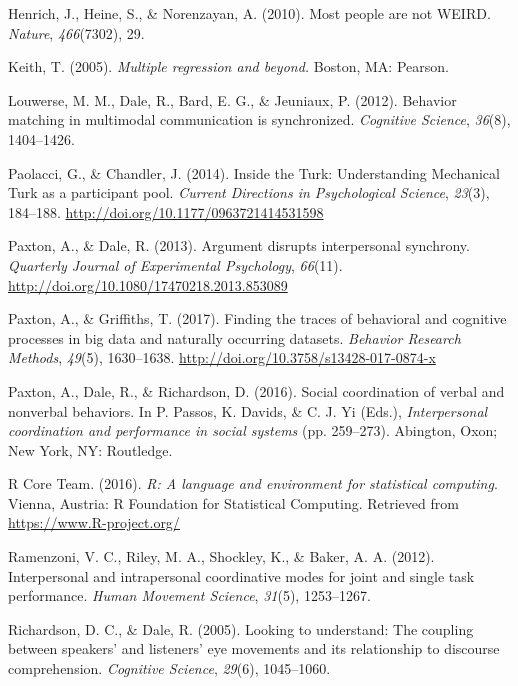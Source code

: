 \documentclass[10pt, letterpaper]{article}
\begin{document}
\hypertarget{ref-henrich2010most}{}
Henrich, J., Heine, S., \& Norenzayan, A. (2010). Most people are not
WEIRD. \emph{Nature}, \emph{466}(7302), 29.

\hypertarget{ref-keith2005multiple}{}
Keith, T. (2005). \emph{Multiple regression and beyond.} Boston, MA:
Pearson.

\hypertarget{ref-louwerse2012behavior}{}
Louwerse, M. M., Dale, R., Bard, E. G., \& Jeuniaux, P. (2012). Behavior
matching in multimodal communication is synchronized. \emph{Cognitive
Science}, \emph{36}(8), 1404--1426.

\hypertarget{ref-paolacci2014inside}{}
Paolacci, G., \& Chandler, J. (2014). Inside the Turk: Understanding
Mechanical Turk as a participant pool. \emph{Current Directions in
Psychological Science}, \emph{23}(3), 184--188.
\url{http://doi.org/10.1177/0963721414531598}

\hypertarget{ref-paxton2013argument}{}
Paxton, A., \& Dale, R. (2013). Argument disrupts interpersonal
synchrony. \emph{Quarterly Journal of Experimental Psychology},
\emph{66}(11). \url{http://doi.org/10.1080/17470218.2013.853089}

\hypertarget{ref-paxton2017finding}{}
Paxton, A., \& Griffiths, T. (2017). Finding the traces of behavioral
and cognitive processes in big data and naturally occurring datasets.
\emph{Behavior Research Methods}, \emph{49}(5), 1630--1638.
\url{http://doi.org/10.3758/s13428-017-0874-x}

\hypertarget{ref-paxton2016social}{}
Paxton, A., Dale, R., \& Richardson, D. (2016). Social coordination of
verbal and nonverbal behaviors. In P. Passos, K. Davids, \& C. J. Yi
(Eds.), \emph{Interpersonal coordination and performance in social
systems} (pp. 259--273). Abington, Oxon; New York, NY: Routledge.

\hypertarget{ref-r2016r}{}
R Core Team. (2016). \emph{R: A language and environment for statistical
computing}. Vienna, Austria: R Foundation for Statistical Computing.
Retrieved from \url{https://www.R-project.org/}

\hypertarget{ref-ramenzoni2012interpersonal}{}
Ramenzoni, V. C., Riley, M. A., Shockley, K., \& Baker, A. A. (2012).
Interpersonal and intrapersonal coordinative modes for joint and single
task performance. \emph{Human Movement Science}, \emph{31}(5),
1253--1267.

\hypertarget{ref-richardson2005looking}{}
Richardson, D. C., \& Dale, R. (2005). Looking to understand: The
coupling between speakers' and listeners' eye movements and its
relationship to discourse comprehension. \emph{Cognitive Science},
\emph{29}(6), 1045--1060.
\end{document}
